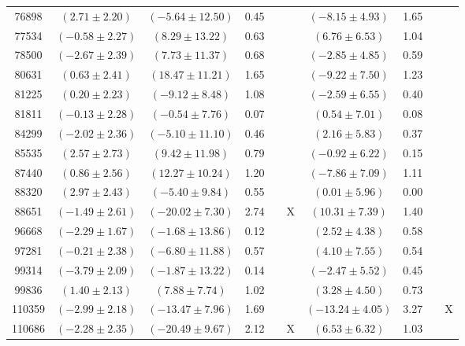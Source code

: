 \documentclass [10pt, twoside] {uwthesis}[2012/04/02]
\begin{document}
{\begin{longtable}[t]{|c|c|cccc|cccc|}
76898	&  $(	2.71	  \pm  	2.20	)$  &  $(	-5.64	  \pm  	12.50	)$  &  	0.45	  &  		  &  		  &  $(	-8.15	  \pm  	4.93	)$  &  	1.65	  &  		  &  		  \\
77534	&  $(	-0.58	  \pm  	2.27	)$  &  $(	8.29	  \pm  	13.22	)$  &  	0.63	  &  		  &  		  &  $(	6.76	  \pm  	6.53	)$  &  	1.04	  &  		  &  		  \\
78500	&  $(	-2.67	  \pm  	2.39	)$  &  $(	7.73	  \pm  	11.37	)$  &  	0.68	  &  		  &  		  &  $(	-2.85	  \pm  	4.85	)$  &  	0.59	  &  		  &  		  \\
80631	&  $(	0.63	  \pm  	2.41	)$  &  $(	18.47	  \pm  	11.21	)$  &  	1.65	  &  		  &  		  &  $(	-9.22	  \pm  	7.50	)$  &  	1.23	  &  		  &  		  \\
81225	&  $(	0.20	  \pm  	2.23	)$  &  $(	-9.12	  \pm  	8.48	)$  &  	1.08	  &  		  &  		  &  $(	-2.59	  \pm  	6.55	)$  &  	0.40	  &  		  &  		  \\
81811	&  $(	-0.13	  \pm  	2.28	)$  &  $(	-0.54	  \pm  	7.76	)$  &  	0.07	  &  		  &  		  &  $(	0.54	  \pm  	7.01	)$  &  	0.08	  &  		  &  		  \\
84299	&  $(	-2.02	  \pm  	2.36	)$  &  $(	-5.10	  \pm  	11.10	)$  &  	0.46	  &  		  &  		  &  $(	2.16	  \pm  	5.83	)$  &  	0.37	  &  		  &  		  \\
85535	&  $(	2.57	  \pm  	2.73	)$  &  $(	9.42	  \pm  	11.98	)$  &  	0.79	  &  		  &  		  &  $(	-0.92	  \pm  	6.22	)$  &  	0.15	  &  		  &  		  \\
87440	&  $(	0.86	  \pm  	2.56	)$  &  $(	12.27	  \pm  	10.24	)$  &  	1.20	  &  		  &  		  &  $(	-7.86	  \pm  	7.09	)$  &  	1.11	  &  		  &  		  \\
88320	&  $(	2.97	  \pm  	2.43	)$  &  $(	-5.40	  \pm  	9.84	)$  &  	0.55	  &  		  &  		  &  $(	0.01	  \pm  	5.96	)$  &  	0.00	  &  		  &  		  \\
88651	&  $(	-1.49	  \pm  	2.61	)$  &  $(	-20.02	  \pm  	7.30	)$  &  	2.74	  &  		  &  	X	  &  $(	10.31	  \pm  	7.39	)$  &  	1.40	  &  		  &  		  \\
96668	&  $(	-2.29	  \pm  	1.67	)$  &  $(	-1.68	  \pm  	13.86	)$  &  	0.12	  &  		  &  		  &  $(	2.52	  \pm  	4.38	)$  &  	0.58	  &  		  &  		  \\
97281	&  $(	-0.21	  \pm  	2.38	)$  &  $(	-6.80	  \pm  	11.88	)$  &  	0.57	  &  		  &  		  &  $(	4.10	  \pm  	7.55	)$  &  	0.54	  &  		  &  		  \\
99314	&  $(	-3.79	  \pm  	2.09	)$  &  $(	-1.87	  \pm  	13.22	)$  &  	0.14	  &  		  &  		  &  $(	-2.47	  \pm  	5.52	)$  &  	0.45	  &  		  &  		  \\
99836	&  $(	1.40	  \pm  	2.13	)$  &  $(	7.88	  \pm  	7.74	)$  &  	1.02	  &  		  &  		  &  $(	3.28	  \pm  	4.50	)$  &  	0.73	  &  		  &  		  \\
110359	&  $(	-2.99	  \pm  	2.18	)$  &  $(	-13.47	  \pm  	7.96	)$  &  	1.69	  &  		  &  		  &  $(	-13.24	  \pm  	4.05	)$  &  	3.27	  &  		  &  	X	  \\
110686	&  $(	-2.28	  \pm  	2.35	)$  &  $(	-20.49	  \pm  	9.67	)$  &  	2.12	  &  		  &  	X	  &  $(	6.53	  \pm  	6.32	)$  &  	1.03	  &  		  &  		  \\  \hline 
\end{longtable}
}
\end{document}
